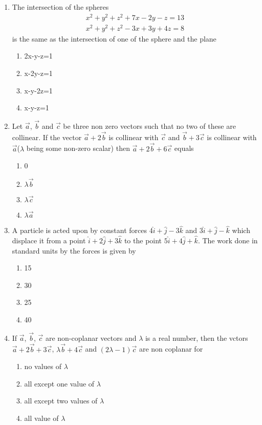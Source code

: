 \begin{enumerate}[label=\arabic*.,ref=\thesubsection.\theenumi]
\item The intersection of the spheres
\begin{align}
x^2+y^2+z^2+7x-2y-z=13
\end{align}
\begin{align}
x^2+y^2+z^2-3x+3y+4z=8
\end{align}
is the same as the intersection of one of the sphere and the plane
\begin{enumerate}
\item 2x-y-z=1
\item x-2y-z=1
\item x-y-2z=1
\item x-y-z=1
\end{enumerate}

\item Let $\overrightarrow{a}$, $\overrightarrow{b}$ and $\overrightarrow{c}$ be three non zero vectors such that no two of these are collinear. If the vector $\overrightarrow{a}+2\overrightarrow{b}$ is collinear with $\overrightarrow{c}$ and $\overrightarrow{b}+3\overrightarrow{c}$ is collinear with $\overrightarrow{a}$($\lambda$ being some non-zero scalar) then $\overrightarrow{a}+2\overrightarrow{b}+6\overrightarrow{c}$ equals
\begin{enumerate}
\item 0
\item $\lambda\overrightarrow{b}$
\item $\lambda\overrightarrow{c}$
\item $\lambda\overrightarrow{a}$
\end{enumerate}

\item A particle is acted upon by constant forces $4\hat{i}+\hat{j}-3\hat{k}$ and $3\hat{i}+\hat{j}-\hat{k}$ which displace it from a point $\hat{i}+2\hat{j}+3\hat{k}$ to the point $5\hat{i}+4\hat{j}+\hat{k}$. The work done in standard units by the forces is given by
\begin{enumerate}
\item 15
\item 30
\item 25
\item 40
\end{enumerate}

\item If $\overrightarrow{a}$, $\overrightarrow{b}$, $\overrightarrow{c}$ are non-coplanar vectors and $\lambda$ is a real number, then the vctors $\overrightarrow{a}+2\overrightarrow{b}+3\overrightarrow{c}$, $\lambda\overrightarrow{b}+4\overrightarrow{c}$ and $(2\lambda-1)\overrightarrow{c}$ are non coplanar for
\begin{enumerate}
\item no values of $\lambda$
\item all except one value of $\lambda$
\item all except two values of $\lambda$
\item all value of $\lambda$
\end{enumerate}


\end{enumerate}

